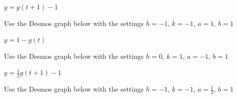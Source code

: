 \documentclass{ximera}
\begin{document}
\begin{question}
\begin{problem}
$y = g(t+1) - 1$

\begin{solution}
Use the Desmos graph below with the settings $h=-1,\,k=-1,\,a=1,\,b=1$

\begin{center} 
\end{center}
\end{solution} 
\end{problem}

\begin{problem}
$y = 1 - g(t)$

\begin{solution}
Use the Desmos graph below with the settings $h=0,\,k=1,\,a=-1,\,b=1$

\begin{center} 
\end{center}
\end{solution} 
\end{problem}

\begin{problem}\label{transsecondgraphlast}
$y = \frac{1}{2}g(t+1)-1$ 

\begin{solution}
Use the Desmos graph below with the settings $h=-1,\,k=-1,\,a=\frac{1}{2},\,b=1$

\begin{center} 
\end{center}
\end{solution} 
\end{problem}

\end{question}
\end{document}

